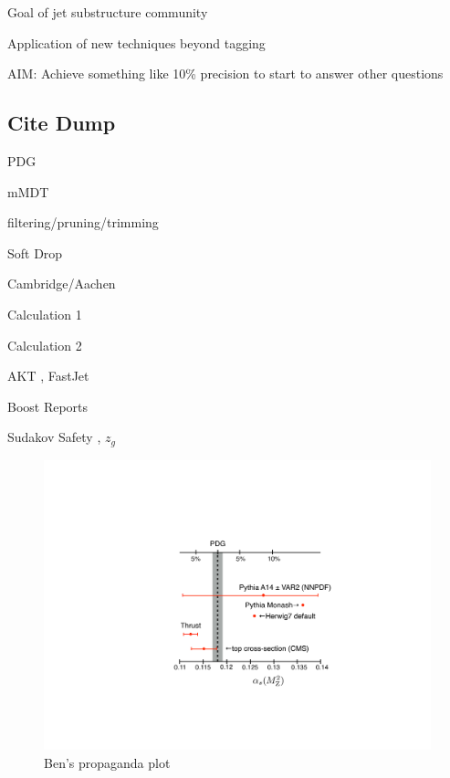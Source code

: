 
Goal of jet substructure community

Application of new techniques beyond tagging

AIM:  Achieve something like 10\% precision to start to answer other questions

\subsection{Cite Dump}

PDG \cite{Olive:2016xmw}

mMDT \cite{Dasgupta:2013ihk,Dasgupta:2013via}

filtering/pruning/trimming \cite{Butterworth:2008iy,Ellis:2009su,Ellis:2009me,Krohn:2009th}

Soft Drop \cite{Larkoski:2014wba}

Cambridge/Aachen \cite{Wobisch:1998wt,Dokshitzer:1997in}

Calculation 1 \cite{Frye:2016okc,Frye:2016aiz}

Calculation 2 \cite{Marzani:2017mva}

AKT \cite{Cacciari:2008gp}, FastJet \cite{Cacciari:2011ma}

Boost Reports \cite{Abdesselam:2010pt,Altheimer:2012mn,Altheimer:2013yza,Adams:2015hiv}

Sudakov Safety \cite{Larkoski:2013paa,Larkoski:2015lea}, $z_g$ \cite{Larkoski:2015lea}

\begin{figure}
\begin{center}
\includegraphics[width = 0.6\columnwidth]{figures/alphas_propaganda.pdf}
\end{center}

\caption{Ben's propaganda plot}

\label{fig:propaganda}

\end{figure}